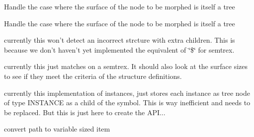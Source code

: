 
\begin{DoxyRefList}
\item[\label{todo__todo000005}%
\hypertarget{todo__todo000005}{}%
Global \hyperlink{tree_8h_affb8b0a4288458ba9b4788a5bbb713ef}{\+\_\+\+\_\+t\+\_\+morph} (\hyperlink{structTnode}{Tnode} $\ast$t, Symbol s, void $\ast$surface, size\+\_\+t length, int allocate)]Handle the case where the surface of the node to be morphed is itself a tree  
\item[\label{todo__todo000005}%
\hypertarget{todo__todo000005}{}%
Global \hyperlink{tree_8h_affb8b0a4288458ba9b4788a5bbb713ef}{\+\_\+\+\_\+t\+\_\+morph} (\hyperlink{structTnode}{Tnode} $\ast$t, Symbol s, void $\ast$surface, size\+\_\+t length, int allocate)]Handle the case where the surface of the node to be morphed is itself a tree  
\item[\label{todo__todo000002}%
\hypertarget{todo__todo000002}{}%
Global \hyperlink{receptor_8h_ad7ed83880a8bb8be0de01ae73b44d13a}{\+\_\+r\+\_\+build\+\_\+def\+\_\+semtrex} (\hyperlink{structReceptor}{Receptor} $\ast$r, Symbol s, \hyperlink{structTnode}{Tnode} $\ast$parent)]currently this won't detect an incorrect strcture with extra children. This is because we don't haven't yet implemented the equivalent of \char`\"{}\$\char`\"{} for semtrex.  
\item[\label{todo__todo000003}%
\hypertarget{todo__todo000003}{}%
Global \hyperlink{receptor_8h_a8978934f20256d927a9f035c2eeafd8d}{\+\_\+r\+\_\+def\+\_\+match} (\hyperlink{structReceptor}{Receptor} $\ast$r, Symbol s, \hyperlink{structTnode}{Tnode} $\ast$t)]currently this just matches on a semtrex. It should also look at the surface sizes to see if they meet the criteria of the structure definitions.  
\item[\label{todo__todo000004}%
\hypertarget{todo__todo000004}{}%
Global \hyperlink{receptor_8h_a7518a44dda01af81556bb6657f18ead4}{\+\_\+r\+\_\+new\+\_\+instance} (\hyperlink{structReceptor}{Receptor} $\ast$r, Symbol s, void $\ast$surface)]currently this implementation of instances, just stores each instance as tree node of type I\+N\+S\+T\+A\+N\+C\+E as a child of the symbol. This is way inefficient and needs to be replaced. But this is just here to create the A\+P\+I...  
\item[\label{todo__todo000001}%
\hypertarget{todo__todo000001}{}%
Class \hyperlink{structtable__elem}{table\+\_\+elem} ]convert path to variable sized item 
\end{DoxyRefList}